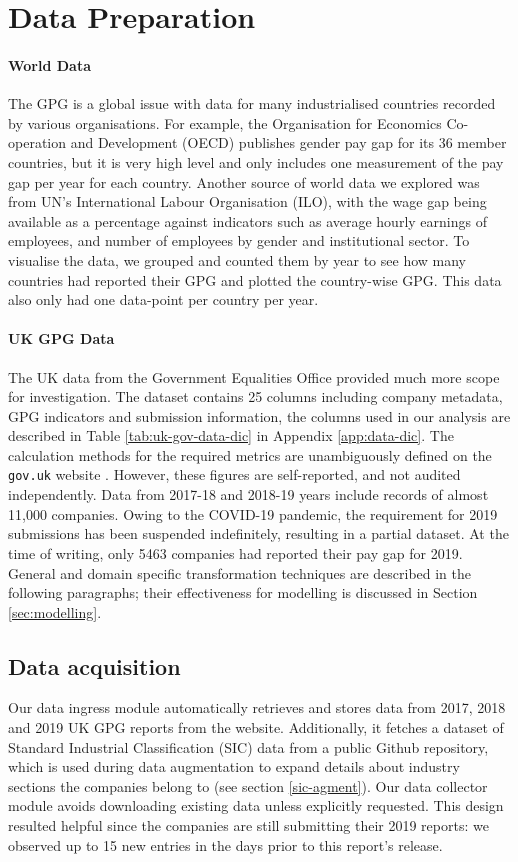 \section{Data Preparation} 
\label{sec:data-prep}

\paragraph{World Data}
The GPG is a global issue with data for many industrialised countries recorded by various organisations. For example, the Organisation for Economics Co-operation and Development (OECD) publishes gender pay gap for its 36 member countries, but it is very high level and only includes one measurement of the pay gap per year for each country. Another source of world data we explored was from UN's International Labour Organisation (ILO), with the wage gap being available as a percentage against indicators such as average hourly earnings of employees, and number of employees by gender and institutional sector.
To visualise the data, we grouped and counted them by year to see how many countries had reported their GPG and plotted the country-wise GPG. This data also only had one data-point per country per year.

\paragraph{UK GPG Data}
The UK data from the Government Equalities Office provided much more scope for investigation.
The dataset contains 25 columns including company metadata, GPG indicators and submission information, the columns used in our analysis are described in Table \ref{tab:uk-gov-data-dic} in Appendix \ref{app:data-dic}.  The calculation methods for the required metrics are unambiguously defined on the \texttt{gov.uk} website \cite{govuk-how-to-calculate}. However, these figures are self-reported, and not audited independently. Data from 2017-18 and 2018-19 years include records of almost 11,000 companies. Owing to the COVID-19 pandemic, the requirement for 2019 submissions has been suspended indefinitely, resulting in a partial dataset. At the time of writing, only 5463 companies had reported their pay gap for 2019. General and domain specific transformation techniques are described in the following paragraphs; their effectiveness for modelling is discussed in Section \ref{sec:modelling}.

\subsection{Data acquisition}
Our data ingress module automatically retrieves and stores data from 2017, 2018 and 2019 UK GPG reports from the  website. Additionally, it fetches a dataset of Standard Industrial Classification (SIC) data from a public Github repository, which is used during data augmentation to expand details about industry sections the companies belong to (see section \ref{sic-agment}). Our data collector module avoids downloading existing data unless explicitly requested. This design resulted helpful since the companies are still submitting their 2019 reports: we observed up to 15 new entries in the days prior to this report's release.

